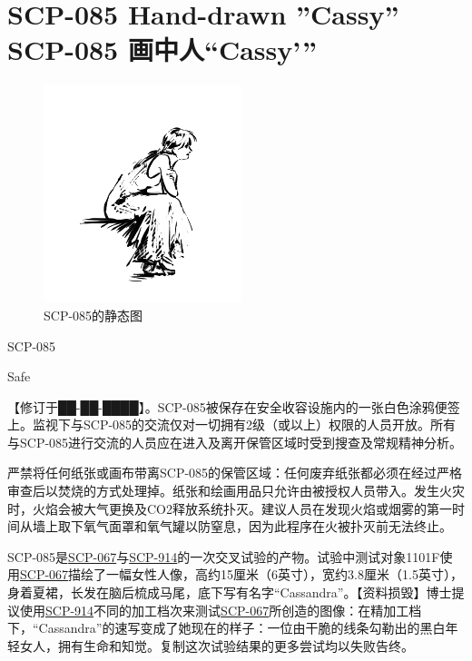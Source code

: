 \chapter[SCP-085 画中人“Cassy'”]{
    SCP-085 Hand-drawn ''Cassy''\\
    SCP-085 画中人“Cassy'”
}

\label{chap:SCP-085}

\begin{figure}[H]
    \centering
    \includegraphics[width=0.5\linewidth]{images/SCP.085.png}
    \caption*{SCP-085的静态图}
\end{figure}

SCP-085

Safe

【修订于██-██-████】。SCP-085被保存在安全收容设施内的一张白色涂鸦便签上。监视下与SCP-085的交流仅对一切拥有2级（或以上）权限的人员开放。所有与SCP-085进行交流的人员应在进入及离开保管区域时受到搜查及常规精神分析。

严禁将任何纸张或画布带离SCP-085的保管区域：任何废弃纸张都必须在经过严格审查后以焚烧的方式处理掉。纸张和绘画用品只允许由被授权人员带入。发生火灾时，火焰会被大气更换及CO2释放系统扑灭。建议人员在发现火焰或烟雾的第一时间从墙上取下氧气面罩和氧气罐以防窒息，因为此程序在火被扑灭前无法终止。

SCP-085是\hyperref[chap:SCP-067]{SCP-067}与\hyperref[chap:SCP-914]{SCP-914}的一次交叉试验的产物。试验中测试对象1101F使用\hyperref[chap:SCP-067]{SCP-067}描绘了一幅女性人像，高约15厘米（6英寸），宽约3.8厘米（1.5英寸），身着夏裙，长发在脑后梳成马尾，底下写有名字“Cassandra”。【资料损毁】博士提议使用\hyperref[chap:SCP-914]{SCP-914}不同的加工档次来测试\hyperref[chap:SCP-067]{SCP-067}所创造的图像：在精加工档下，“Cassandra”的速写变成了她现在的样子：一位由干脆的线条勾勒出的黑白年轻女人，拥有生命和知觉。复制这次试验结果的更多尝试均以失败告终。

